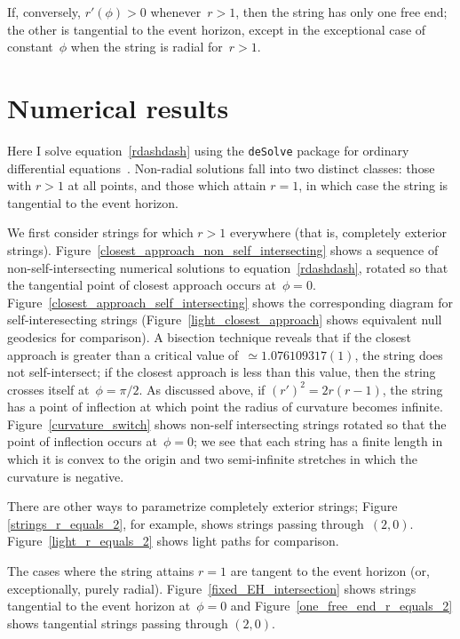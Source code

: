 \documentclass[prb,preprint]{revtex4-1}
\begin{document}
If, conversely, $r'(\phi)>0$ whenever~$r>1$, then the string has only
one free end; the other is tangential to the event horizon, except in
the exceptional case of constant~$\phi$ when the string is radial
for~$r>1$.

\section{Numerical results}

Here I solve equation~\ref{rdashdash} using the \verb+deSolve+ package
for ordinary differential equations~\cite{soetart2010}.  Non-radial
solutions fall into two distinct classes: those with $r>1$ at all
points, and those which attain $r=1$, in which case the string is
tangential to the event horizon.

We first consider strings for which $r>1$ everywhere (that is,
completely exterior strings).
Figure~\ref{closest_approach_non_self_intersecting} shows a sequence
of non-self-intersecting numerical solutions to
equation~\ref{rdashdash}, rotated so that the tangential point of
closest approach occurs at~$\phi=0$.
Figure~\ref{closest_approach_self_intersecting} shows the
corresponding diagram for self-interesecting strings
(Figure~\ref{light_closest_approach} shows equivalent null geodesics
for comparison).  A bisection technique reveals that if the closest
approach is greater than a critical value of~$\simeq 1.076109317(1)$,
the string does not self-intersect; if the closest approach is less
than this value, then the string crosses itself at~$\phi=\pi/2$.  As
discussed above, if $\left(r'\right)^2=2r(r-1)$, the string has a
point of inflection at which point the radius of curvature becomes
infinite.  Figure~\ref{curvature_switch} shows non-self intersecting
strings rotated so that the point of inflection occurs at~$\phi=0$; we
see that each string has a finite length in which it is convex to the
origin and two semi-infinite stretches in which the curvature is
negative.

There are other ways to parametrize completely exterior strings;
Figure \ref{strings_r_equals_2}, for example, shows strings passing
through~$(2,0)$.  Figure~\ref{light_r_equals_2} shows light paths for
comparison.

The cases where the string attains $r=1$ are tangent to the event
horizon (or, exceptionally, purely radial).
Figure~\ref{fixed_EH_intersection} shows strings tangential to the
event horizon at~$\phi=0$ and Figure~\ref{one_free_end_r_equals_2}
shows tangential strings passing through $(2,0)$.
\end{document}
